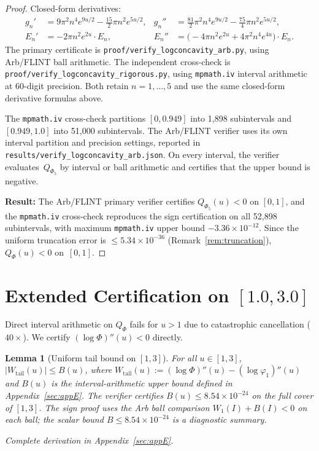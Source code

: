 \documentclass[11pt]{article}
\newtheorem{lemma}[theorem]{Lemma}
\theoremstyle{definition}
\theoremstyle{remark}
\begin{document}
\begin{proof}
Closed-form derivatives:
\begin{align*}
g_n' &= 9\pi^2 n^4 e^{9u/2} - \tfrac{15}{2}\pi n^2 e^{5u/2}, &
g_n'' &= \tfrac{81}{2}\pi^2 n^4 e^{9u/2} - \tfrac{75}{4}\pi n^2 e^{5u/2}, \\
E_n' &= -2\pi n^2 e^{2u}\cdot E_n, &
E_n'' &= \bigl(-4\pi n^2 e^{2u} + 4\pi^2 n^4 e^{4u}\bigr)\cdot E_n.
\end{align*}
The primary certificate is \texttt{proof/verify\_logconcavity\_arb.py}, using
Arb/FLINT ball arithmetic.
The independent cross-check is \texttt{proof/verify\_logconcavity\_rigorous.py}, using
\texttt{mpmath.iv} interval arithmetic at 60-digit precision.
Both retain $n = 1,\ldots,5$ and use the same closed-form derivative formulas above.

The \texttt{mpmath.iv} cross-check partitions $[0, 0.949]$ into 1{,}898 subintervals
and $[0.949, 1.0]$ into 51{,}000 subintervals.
The Arb/FLINT verifier uses its own interval partition and precision settings,
reported in \texttt{results/verify\_logconcavity\_arb.json}.
On every interval, the verifier evaluates~$Q_{\Phi_5}$ by interval or ball
arithmetic and certifies that the upper bound is negative.

\textbf{Result:} The Arb/FLINT primary verifier certifies $Q_{\Phi_5}(u) < 0$
on $[0,1]$, and the \texttt{mpmath.iv} cross-check reproduces the sign
certification on all 52{,}898 subintervals, with maximum \texttt{mpmath.iv}
upper bound $-3.36 \times 10^{-12}$.
Since the uniform truncation error is $\leq 5.34 \times 10^{-36}$
(Remark~\ref{rem:truncation}),
$Q_\Phi(u) < 0$ on~$[0,1]$.
\end{proof}

\section{Extended Certification on $[1.0, 3.0]$}
\label{sec:extended}

Direct interval arithmetic on $Q_\Phi$ fails for $u > 1$ due to catastrophic
cancellation ($40\times$).
We certify $(\log\Phi)''(u) < 0$ directly.

\begin{lemma}[Uniform tail bound on {$[1,3]$}]\label{lem:wtail}
For all $u\in[1,3]$, $|W_{\mathrm{tail}}(u)| \leq B(u)$,
where $W_{\mathrm{tail}}(u) := (\log\Phi)''(u) - (\log\varphi_1)''(u)$
and $B(u)$ is the interval-arithmetic upper bound defined in Appendix~\ref{sec:appE}.
The verifier certifies $B(u) \leq 8.54\times 10^{-24}$ on the full cover of $[1,3]$.
The sign proof uses the Arb ball comparison $W_1(I)+B(I)<0$ on each ball;
the scalar bound $B\leq 8.54\times 10^{-24}$ is a diagnostic summary.

Complete derivation in Appendix~\ref{sec:appE}.
\end{lemma}
\end{document}
